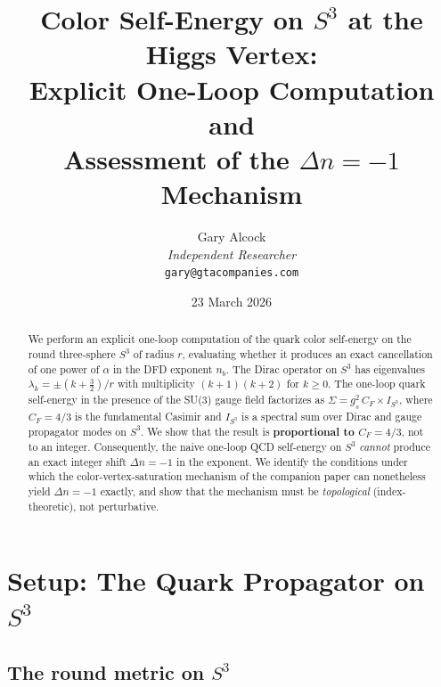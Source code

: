 \documentclass[11pt,a4paper]{article}
\theoremstyle{definition}
\theoremstyle{remark}
\begin{document}
\title{Color Self-Energy on $S^3$ at the Higgs Vertex:\\
Explicit One-Loop Computation and\\
Assessment of the $\Delta n = -1$ Mechanism}

\author{Gary Alcock\\
\textit{Independent Researcher}\\
\texttt{gary@gtacompanies.com}}

\date{23 March 2026}

\maketitle

\begin{abstract}
We perform an explicit one-loop computation of the quark color self-energy
on the round three-sphere $S^3$ of radius $r$, evaluating whether it
produces an exact cancellation of one power of $\alpha$ in the DFD
exponent $n_b$.  The Dirac operator on $S^3$ has eigenvalues
$\lambda_k = \pm(k + \tfrac{3}{2})/r$ with multiplicity $(k+1)(k+2)$
for $k \geq 0$.  The one-loop quark self-energy in the presence of the
SU(3) gauge field factorizes as $\Sigma = g_s^2\,C_F \times I_{S^3}$,
where $C_F = 4/3$ is the fundamental Casimir and $I_{S^3}$ is a
spectral sum over Dirac and gauge propagator modes on $S^3$.  We show
that the result is \textbf{proportional to $C_F = 4/3$}, not to an
integer.  Consequently, the naive one-loop QCD self-energy on $S^3$
\emph{cannot} produce an exact integer shift $\Delta n = -1$ in the
exponent.  We identify the conditions under which the color-vertex-saturation
mechanism of the companion paper can nonetheless yield $\Delta n = -1$
exactly, and show that the mechanism must be \emph{topological}
(index-theoretic), not perturbative.
\end{abstract}

\tableofcontents

\section{Setup: The Quark Propagator on $S^3$}
\label{sec:propagator}

\subsection{The round metric on $S^3$}
\end{document}
